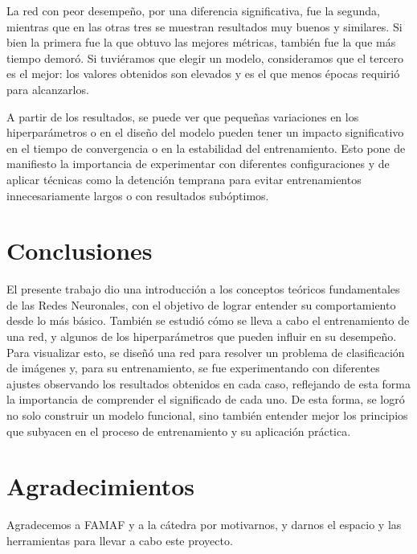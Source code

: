 \documentclass[aps,twocolumn,groupedaddress]{revtex4-2}
\begin{document}
La red con peor desempeño, por una diferencia significativa, fue la segunda, mientras que en las otras tres se muestran resultados muy buenos y similares. Si bien la primera fue la que obtuvo las mejores métricas, también fue la que más tiempo demoró. Si tuviéramos que elegir un modelo, consideramos que el tercero es el mejor: los valores obtenidos son elevados y es el que menos épocas requirió para alcanzarlos.

A partir de los resultados, se puede ver que pequeñas variaciones en los hiperparámetros o en el diseño del modelo pueden tener un impacto significativo en el tiempo de convergencia o en la estabilidad del entrenamiento. Esto pone de manifiesto la importancia de experimentar con diferentes configuraciones y de aplicar técnicas como la detención temprana para evitar entrenamientos innecesariamente largos o con resultados subóptimos.

\section{Conclusiones}
El presente trabajo dio una introducción a los conceptos teóricos fundamentales de las Redes Neuronales, con el objetivo de lograr entender su comportamiento desde lo más básico. También se estudió cómo se lleva a cabo el entrenamiento de una red, y algunos de los hiperparámetros que pueden influir en su desempeño. Para visualizar esto, se diseñó una red para resolver un problema de clasificación de imágenes y, para su entrenamiento, se fue experimentando con diferentes ajustes observando los resultados obtenidos en cada caso, reflejando de esta forma la importancia de comprender el significado de cada uno. De esta forma, se logró no solo construir un modelo funcional, sino también entender mejor los principios que subyacen en el proceso de entrenamiento y su aplicación práctica.

\section{Agradecimientos}
Agradecemos a FAMAF y a la cátedra por motivarnos, y darnos el espacio y las herramientas para llevar a cabo este proyecto. 

% 



\end{document}
